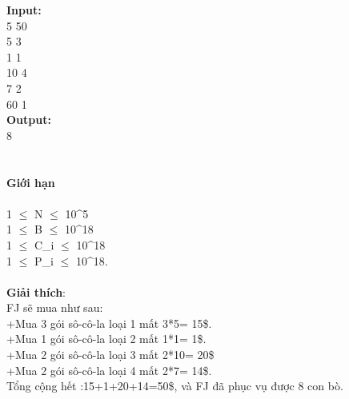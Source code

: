\textbf{Input:}
\\5 50
\\5 3
\\1 1
\\10 4
\\7 2
\\60 1
\\\textbf{Output:}
\\8
\\
\\
\\\textbf{​Giới hạn}
\\
\\1 $\le$ N $\le$ 10^5
\\1  $\le$  B  $\le$  10^18
\\1  $\le$  C\_i  $\le$  10^18
\\1  $\le$  P\_i  $\le$  10^18.
\\
\\\textbf{Giải thích}:
\\FJ sẽ mua như sau:
\\+Mua 3 gói sô-cô-la loại 1 mất 3*5= 15\$.
\\+Mua 1 gói sô-cô-la loại 2 mất 1*1= 1\$.
\\+Mua 2 gói sô-cô-la loại 3 mất 2*10= 20\$
\\+Mua 2 gói sô-cô-la loại 4 mất 2*7= 14\$.
\\Tổng cộng hết :15+1+20+14=50\$, và FJ đã phục vụ được 8 con bò.